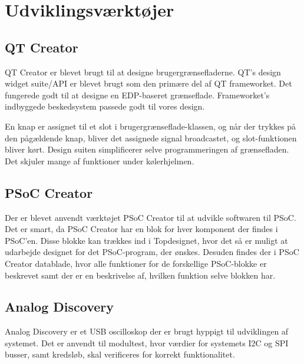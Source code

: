 \chapter{Udviklingsværktøjer}

\section{QT Creator}
QT Creator \cite{QTCreator} er blevet brugt til at designe brugergrænsefladerne.
QT's design widget suite/API er blevet brugt som den primære del af QT frameworket. Det fungerede godt til at designe en EDP-baseret grænseflade. Frameworket's indbyggede beskedsystem passede godt til vores design.

En knap er assignet til et slot i brugergrænseflade-klassen, og når der trykkes på den pågældende knap, bliver det assignede signal broadcastet, og slot-funktionen bliver kørt.
Design suiten simplificerer selve programmeringen af grænsefladen. Det skjuler mange af funktioner under kølerhjelmen.

\section{PSoC Creator}
Der er blevet anvendt værktøjet PSoC Creator til at udvikle softwaren til PSoC. Det er smart, da PSoC Creator har en blok for hver komponent der findes i PSoC'en. Disse blokke kan trækkes ind i Topdesignet, hvor det så er muligt at udarbejde designet for det PSoC-program, der ønskes. Desuden findes der i PSoC Creator datablade, hvor alle funktioner for de forskellige PSoC-blokke er beskrevet samt der er en beskrivelse af, hvilken funktion selve blokken har.

\section{Analog Discovery}
Analog Discovery er et USB oscilloskop der er brugt hyppigt til udviklingen af systemet. Det er anvendt til modultest, hvor værdier for systemets I2C og SPI busser, samt kredsløb, skal verificeres for korrekt funktionalitet.